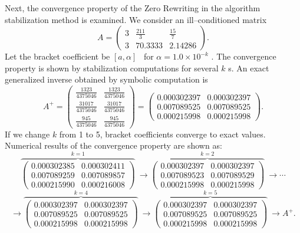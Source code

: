 Next, the convergence property of the Zero Rewriting 
in the algorithm stabilization method is examined.  We 
consider an ill--conditioned matrix 
$$ A = \left( \begin{array}{ccc}
3 & \frac{211}{3} & \frac{15}{7} \\ 
3 & 70.3333 & 2.14286 \end{array} \right). $$
Let the bracket coefficient be $[a, \alpha]$ \ for 
$\alpha = 1.0 \times 10^{-k}$ .  The convergence property 
is shown by stabilization computations for several $k$ s.  
An exact generalized inverse obtained by symbolic 
computation is 
$$ A^+= \left( \begin{array}{cc}
\frac{1323}{4375046} & \frac{1323}{4375046} \\
\frac{31017}{4375046} &
\frac{31017}{4375046} \\ \frac{945}{4375046} &
\frac{945}{4375046} 
\end{array} \right) = \left( \begin{array}{cc}
0.000302397 & 0.000302397 \\ 0.007089525 & 0.007089525 \\
0.000215998 & 0.000215998 \end{array} \right) . $$
If we change $k $ from 1 to 5, bracket coefficients 
converge to exact values.  Numerical results of the 
convergence property are shown as:
\[ \overbrace{ \left( \begin{array}{cc}
0.000302385 & 0.000302411 \\ 0.007089259 & 0.007089857 \\
0.000215990 & 0.000216008 \end{array} \right) }^{k=1}  
\ \rightarrow 
\overbrace{ \left( \begin{array}{cc}
0.000302397 & 0.000302397 \\ 0.007089523 & 0.007089529 \\
0.000215998 & 0.000215998 \end{array} \right) }^{k=2}  
\ \rightarrow 
\cdots \]
\[ \rightarrow 
\overbrace{ \left( \begin{array}{cc}
0.000302397 & 0.000302397 \\ 0.007089525 & 0.007089525 \\
0.000215998 & 0.000215998 \end{array} \right) }^{k=4}  
\ \rightarrow 
\overbrace{ \left( \begin{array}{cc}
0.000302397 & 0.000302397 \\ 0.007089525 & 0.007089525 \\
0.000215998 & 0.000215998 \end{array} \right) }^{k=5} 
\ \rightarrow 
A^+ . \]
